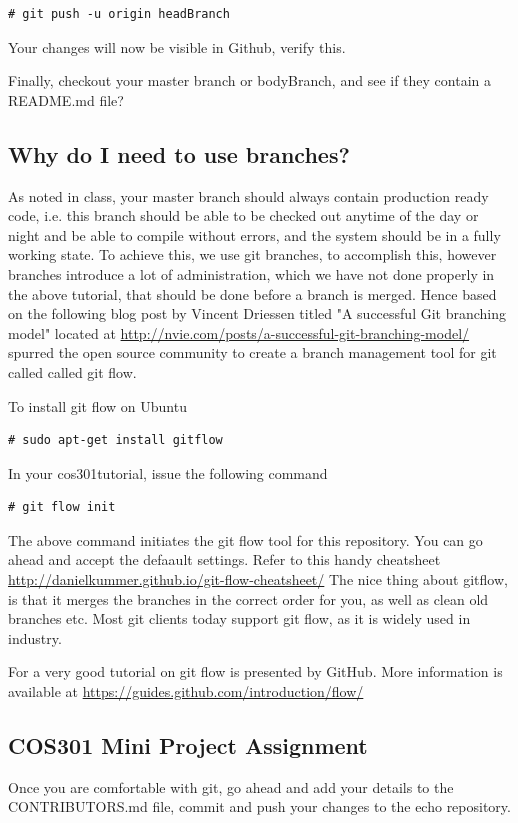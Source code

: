 \documentclass[a4paper,10pt]{article}
\begin{document}
\begin{lstlisting}[style=TerminalStyle]
# git push -u origin headBranch
\end{lstlisting}

Your changes will now be visible in Github, verify this.

Finally, checkout your master branch or bodyBranch, and see if they contain a README.md file?

\subsection{Why do I need to use branches?}

As noted in class, your master branch should always contain production ready code, i.e. this branch should be able to be checked out anytime of the day or night and be able to compile without errors, and the system should be in a fully working state. To achieve this, we use git branches, to accomplish this, however branches introduce a lot of administration, which we have not done properly in the above tutorial, that should be done before a branch is merged.  Hence based on the following blog post by Vincent Driessen titled "A successful Git branching model" located at \url{http://nvie.com/posts/a-successful-git-branching-model/} spurred the open source community to create a branch management tool for git called called git flow.

To install git flow on Ubuntu
\begin{lstlisting}[style=TerminalStyle]
# sudo apt-get install gitflow
\end{lstlisting}

In your cos301tutorial, issue the following command
\begin{lstlisting}[style=TerminalStyle]
# git flow init
\end{lstlisting}

The above command initiates the git flow tool for this repository. You can go ahead and accept the defaault settings. Refer to this handy cheatsheet \url{http://danielkummer.github.io/git-flow-cheatsheet/}
The nice thing about gitflow, is that it merges the branches in the correct order for you, as well as clean old branches etc. Most git clients today support git flow, as it is widely used in industry.

For a very good tutorial on git flow is presented by GitHub. More information is available at \url{https://guides.github.com/introduction/flow/}

\subsection{COS301 Mini Project Assignment}
Once you are comfortable with git, go ahead and add your details to the CONTRIBUTORS.md file, commit and push your changes to the echo repository.
\end{document}

